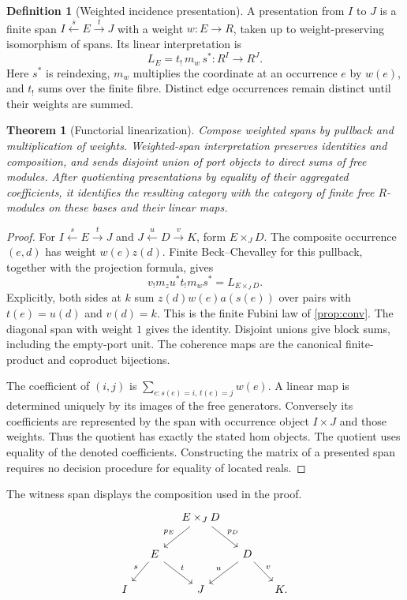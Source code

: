 \documentclass[11pt,a4paper]{article}
\newtheorem{theorem}{Theorem}[section]
\theoremstyle{definition}
\newtheorem{definition}[definition]{Definition}
\theoremstyle{remark}\newaliascnt{remark}{theorem}
\numberwithin{equation}{section}
\begin{document}
\begin{definition}[Weighted incidence presentation]
A presentation from $I$ to $J$ is a finite span $I\xleftarrow{s}E\xrightarrow{t}J$ with a weight $w:E\to R$, taken up to weight-preserving isomorphism of spans. Its linear interpretation is
\[
 L_E=t_!\,m_w\,s^*:R^I\longrightarrow R^J.
\]
Here $s^*$ is reindexing, $m_w$ multiplies the coordinate at an occurrence $e$ by $w(e)$, and $t_!$ sums over the finite fibre. Distinct edge occurrences remain distinct until their weights are summed.
\end{definition}

\begin{theorem}[Functorial linearization]\label{neural:thm:linearization}
Compose weighted spans by pullback and multiplication of weights. Weighted-span interpretation preserves identities and composition, and sends disjoint union of port objects to direct sums of free modules. After quotienting presentations by equality of their aggregated coefficients, it identifies the resulting category with the category of finite free $R$-modules on these bases and their linear maps.
\end{theorem}
\begin{proof}
For $I\xleftarrow{s}E\xrightarrow{t}J$ and $J\xleftarrow{u}D\xrightarrow{v}K$, form $E\times_JD$. The composite occurrence $(e,d)$ has weight $w(e)z(d)$. Finite Beck--Chevalley for this pullback, together with the projection formula, gives
\[
 v_!m_z u^*t_!m_ws^* = L_{E\times_J D}.
\]
Explicitly, both sides at $k$ sum $z(d)w(e)a(s(e))$ over pairs with $t(e)=u(d)$ and $v(d)=k$. This is the finite Fubini law of \cref{prop:conv}. The diagonal span with weight $1$ gives the identity. Disjoint unions give block sums, including the empty-port unit. The coherence maps are the canonical finite-product and coproduct bijections.

The coefficient of $(i,j)$ is $\sum_{e:s(e)=i,\,t(e)=j}w(e)$. A linear map is determined uniquely by its images of the free generators. Conversely its coefficients are represented by the span with occurrence object $I\times J$ and those weights. Thus the quotient has exactly the stated hom objects. The quotient uses equality of the denoted coefficients. Constructing the matrix of a presented span requires no decision procedure for equality of located reals.
\end{proof}
The witness span displays the composition used in the proof.
\[
\begin{tikzcd}[column sep=small,row sep=normal]
 &&E\times_J D\arrow[dl,"p_E"']\arrow[dr,"p_D"]\\
 &E\arrow[dl,"s"']\arrow[dr,"t"]&&D\arrow[dl,"u"']\arrow[dr,"v"]\\
 I&&J&&K .
\end{tikzcd}
\]
\end{document}
